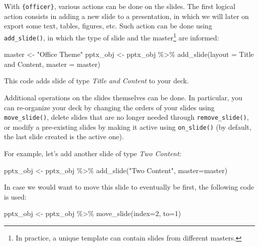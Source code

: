 \documentclass[
]{krantz}
\makeatletter
\newenvironment{Shaded}{\begin{snugshade}}{\end{snugshade}}
\newcommand{\AttributeTok}[1]{\textcolor[rgb]{0.61,0.61,0.61}{#1}}
\newcommand{\DecValTok}[1]{\textcolor[rgb]{0.06,0.06,0.06}{#1}}
\newcommand{\FunctionTok}[1]{\textcolor[rgb]{0,0,0}{#1}}
\newcommand{\NormalTok}[1]{#1}
\newcommand{\OtherTok}[1]{\textcolor[rgb]{0.37,0.37,0.37}{#1}}
\newcommand{\SpecialCharTok}[1]{\textcolor[rgb]{0,0,0}{#1}}
\newcommand{\StringTok}[1]{\textcolor[rgb]{0.5,0.5,0.5}{#1}}
\newenvironment{kframe}{%
\medskip{}
\setlength{\fboxsep}{.8em}
 \def\at@end@of@kframe{}%
 \ifinner\ifhmode%
  \def\at@end@of@kframe{\end{minipage}}%
  \begin{minipage}{\columnwidth}%
 \fi\fi%
 \def\FrameCommand##1{\hskip\@totalleftmargin \hskip-\fboxsep
 \colorbox{shadecolor}{##1}\hskip-\fboxsep
     \hskip-\linewidth \hskip-\@totalleftmargin \hskip\columnwidth}%
 \MakeFramed {\advance\hsize-\width
   \@totalleftmargin\z@ \linewidth\hsize
   \@setminipage}}%
 {\par\unskip\endMakeFramed%
 \at@end@of@kframe}
\renewenvironment{Shaded}{\begin{kframe}}{\end{kframe}}
\makeatother
\begin{document}
With \texttt{\{officer\}}, various actions can be done on the slides. The first logical action consists in adding a new slide to a presentation, in which we will later on export some text, tables, figures, etc. Such action can be done using \texttt{add\_slide()}, in which the type of slide and the master\footnote{In practice, a unique template can contain slides from different masters.} are informed:

\begin{Shaded}
\begin{Highlighting}[]
\NormalTok{master }\OtherTok{\textless{}{-}} \StringTok{"Office Theme"}
\NormalTok{pptx\_obj }\OtherTok{\textless{}{-}}\NormalTok{ pptx\_obj }\SpecialCharTok{\%\textgreater{}\%} 
  \FunctionTok{add\_slide}\NormalTok{(}\AttributeTok{layout =} \StringTok{\textquotesingle{}Title and Content\textquotesingle{}}\NormalTok{, }\AttributeTok{master =}\NormalTok{ master)}
\end{Highlighting}
\end{Shaded}

This code adds slide of type \emph{Title and Content} to your deck.

Additional operations on the slides themselves can be done. In particular, you can re-organize your deck by changing the orders of your slides using \texttt{move\_slide()}, delete slides that are no longer needed through \texttt{remove\_slide()}, or modify a pre-existing slides by making it active using \texttt{on\_slide()} (by default, the last slide created is the active one).

For example, let's add another slide of type \emph{Two Content}:

\begin{Shaded}
\begin{Highlighting}[]
\NormalTok{pptx\_obj }\OtherTok{\textless{}{-}}\NormalTok{ pptx\_obj }\SpecialCharTok{\%\textgreater{}\%} 
  \FunctionTok{add\_slide}\NormalTok{(}\StringTok{"Two Content"}\NormalTok{, }\AttributeTok{master=}\NormalTok{master)}
\end{Highlighting}
\end{Shaded}

In case we would want to move this slide to eventually be first, the following code is used:

\begin{Shaded}
\begin{Highlighting}[]
\NormalTok{pptx\_obj }\OtherTok{\textless{}{-}}\NormalTok{ pptx\_obj }\SpecialCharTok{\%\textgreater{}\%} 
  \FunctionTok{move\_slide}\NormalTok{(}\AttributeTok{index=}\DecValTok{2}\NormalTok{, }\AttributeTok{to=}\DecValTok{1}\NormalTok{)}
\end{Highlighting}
\end{Shaded}
\end{document}
